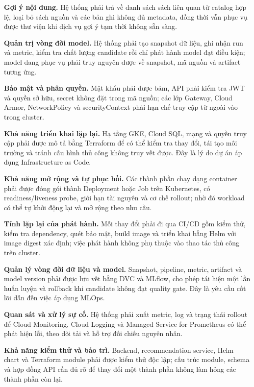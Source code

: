 \textbf{Gợi ý nội dung.} Hệ thống phải trả về danh sách sách liên quan từ catalog hợp lệ, loại bỏ sách nguồn và các bản ghi không đủ metadata, đồng thời vẫn phục vụ được thư viện khi dịch vụ gợi ý tạm thời không sẵn sàng.

\textbf{Quản trị vòng đời model.} Hệ thống phải tạo snapshot dữ liệu, ghi nhận run và metric, kiểm tra chất lượng candidate rồi chỉ phát hành model đạt điều kiện; model đang phục vụ phải truy nguyên được về snapshot, mã nguồn và artifact tương ứng.

\textbf{Bảo mật và phân quyền.} Mật khẩu phải được băm, API phải kiểm tra JWT và quyền sở hữu, secret không đặt trong mã nguồn; các lớp Gateway, Cloud Armor, NetworkPolicy và securityContext phải hạn chế truy cập từ ngoài vào trong cluster.

\textbf{Khả năng triển khai lặp lại.} Hạ tầng GKE, Cloud SQL, mạng và quyền truy cập phải được mô tả bằng Terraform để có thể kiểm tra thay đổi, tái tạo môi trường và tránh cấu hình thủ công không truy vết được. Đây là lý do dự án áp dụng Infrastructure as Code.

\textbf{Khả năng mở rộng và tự phục hồi.} Các thành phần chạy dạng container phải được đóng gói thành Deployment hoặc Job trên Kubernetes, có readiness/liveness probe, giới hạn tài nguyên và cơ chế rollout; nhờ đó workload có thể tự khởi động lại và mở rộng theo nhu cầu.

\textbf{Tính lặp lại của phát hành.} Mỗi thay đổi phải đi qua CI/CD gồm kiểm thử, kiểm tra dependency, quét bảo mật, build image và triển khai bằng Helm với image digest xác định; việc phát hành không phụ thuộc vào thao tác thủ công trên cluster.

\textbf{Quản lý vòng đời dữ liệu và model.} Snapshot, pipeline, metric, artifact và model version phải được lưu vết bằng DVC và MLflow, cho phép tái hiện một lần huấn luyện và rollback khi candidate không đạt quality gate. Đây là yêu cầu cốt lõi dẫn đến việc áp dụng MLOps.

\textbf{Quan sát và xử lý sự cố.} Hệ thống phải xuất metric, log và trạng thái rollout để Cloud Monitoring, Cloud Logging và Managed Service for Prometheus có thể phát hiện lỗi, theo dõi tải và hỗ trợ đối chiếu nguyên nhân.

\textbf{Khả năng kiểm thử và bảo trì.} Backend, recommendation service, Helm chart và Terraform module phải được kiểm thử độc lập; cấu trúc module, schema và hợp đồng API cần đủ rõ để thay đổi một thành phần không làm hỏng các thành phần còn lại.

